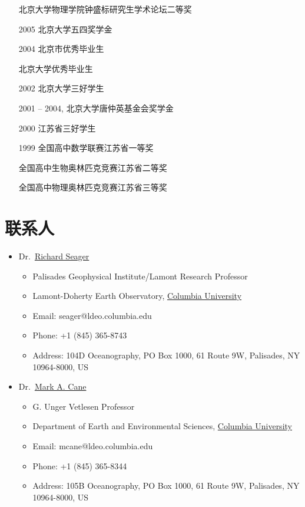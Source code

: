 \documentclass[11pt]{article}
\newcommand{\cu}{\href{http://www.columbia.edu}{Columbia University}}
\newcommand{\richard}{\href{http://www.ldeo.columbia.edu/res/div/ocp/people/seager/}{Richard Seager}}
\newcommand{\cane}{\href{http://www.ldeo.columbia.edu/user/mcane}{Mark A. Cane}}
\begin{document}
\begin{CJK*}{UTF8}{gkai}
\begin{itemize}[leftmargin=10ex,label={},noitemsep,nolistsep]
	\item[\phantom{2007}] 北京大学物理学院钟盛标研究生学术论坛二等奖 
	
	\item[2005] 北京大学五四奖学金	
	
	\item[2004] 北京市优秀毕业生
	
	\item[\phantom{2004}] 北京大学优秀毕业生
		
	\item[2002] 北京大学三好学生
	
	\item[2001]-- 2004, 北京大学唐仲英基金会奖学金
		
	\item[2000] 江苏省三好学生
	
	\item[1999] 全国高中数学联赛江苏省一等奖

	\item[\phantom{1999}] 全国高中生物奥林匹克竞赛江苏省二等奖

	\item[\phantom{1999}] 全国高中物理奥林匹克竞赛江苏省三等奖
\end{itemize}


\section{联系人}
\begin{itemize}[leftmargin=4ex]
	\item Dr.~\richard{}
	\begin{itemize}
		\item Palisades Geophysical Institute/Lamont Research Professor 
		\item Lamont-Doherty Earth Observatory, \cu{}
    		\item Email: seager@ldeo.columbia.edu
		\item Phone: +1 (845) 365-8743 
    	 	\item Address: 104D Oceanography, PO Box 1000, 61 Route 9W, Palisades, NY 10964-8000, US 
	 	\end{itemize}
	
	\item Dr.~\cane{}
	\begin{itemize}
		\item G. Unger Vetlesen Professor
		\item Department of Earth and Environmental Sciences, \cu{}
    		\item Email: mcane@ldeo.columbia.edu
		\item Phone: +1 (845) 365-8344 
    	 	\item Address: 105B Oceanography, PO Box 1000, 61 Route 9W, Palisades, NY 10964-8000, US 
	 	\end{itemize}
	

\end{itemize}
\end{CJK*}
\end{document}
